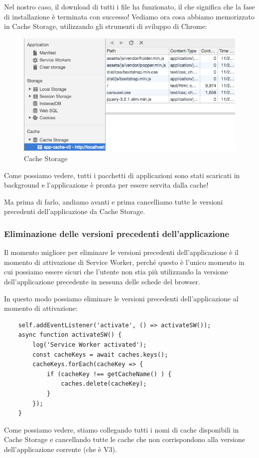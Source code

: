 \documentclass[italian]{article}
\begin{document}
Nel nostro caso, il download di tutti i file ha funzionato, il che significa che la fase di installazione è terminata con successo! Vediamo ora cosa abbiamo memorizzato in Cache Storage, utilizzando gli strumenti di sviluppo di Chrome:
\begin{figure}[h]
	\centering
	\includegraphics[width=1\linewidth]{CacheStorage}
	\caption{Cache Storage}
	\label{fig:Cache Storage}
\end{figure}
Come possiamo vedere, tutti i pacchetti di applicazioni sono stati scaricati in background e l'applicazione è pronta per essere servita dalla cache!

Ma prima di farlo, andiamo avanti e prima cancelliamo tutte le versioni precedenti dell'applicazione da Cache Storage.
\subsubsection{Eliminazione delle versioni precedenti dell'applicazione}
Il momento migliore per eliminare le versioni precedenti dell'applicazione è il momento di attivazione di Service Worker, perché questo è l'unico momento in cui possiamo essere sicuri che l'utente non stia più utilizzando la versione dell'applicazione precedente in nessuna delle schede del browser.

In questo modo possiamo eliminare le versioni precedenti dell'applicazione al momento di attivazione:
\begin{lstlisting}
	self.addEventListener('activate', () => activateSW());
	async function activateSW() {
		log('Service Worker activated');
		const cacheKeys = await caches.keys();	
		cacheKeys.forEach(cacheKey => {
			if (cacheKey !== getCacheName() ) {
				caches.delete(cacheKey);
			}
		});
	}
\end{lstlisting}
Come possiamo vedere, stiamo collegando tutti i nomi di cache disponibili in Cache Storage e cancellando tutte le cache che non corrispondono alla versione dell'applicazione corrente (che è V3).
\end{document}
